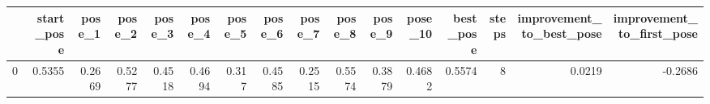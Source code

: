 \begin{tabular}{lrrrrrrrrrrrrrrr}
\toprule
{} &  start\_pose &  pose\_1 &  pose\_2 &  pose\_3 &  pose\_4 &  pose\_5 &  pose\_6 &  pose\_7 &  pose\_8 &  pose\_9 &  pose\_10 &  best\_pose &  steps &  improvement\_to\_best\_pose &  improvement\_to\_first\_pose \\
\midrule
0 &      0.5355 &  0.2669 &  0.5277 &  0.4518 &  0.4694 &   0.317 &  0.4585 &  0.2515 &  0.5574 &  0.3879 &   0.4682 &     0.5574 &      8 &                    0.0219 &                    -0.2686 \\
\bottomrule
\end{tabular}
